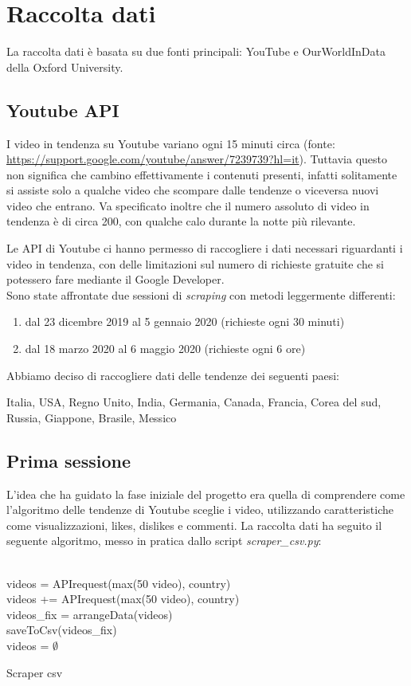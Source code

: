 \section*{Raccolta dati}
La raccolta dati è basata su due fonti principali: YouTube e OurWorldInData della Oxford University.

\subsection*{Youtube API}
I video in tendenza su Youtube variano ogni 15 minuti circa (fonte: \url{https://support.google.com/youtube/answer/7239739?hl=it}). Tuttavia questo non significa che cambino effettivamente i contenuti presenti, infatti solitamente si assiste solo a qualche video che scompare dalle tendenze o viceversa nuovi video che entrano. Va specificato inoltre che il numero assoluto di video in tendenza è di circa 200, con qualche calo durante la notte più rilevante.

Le API di Youtube ci hanno permesso di raccogliere i dati necessari riguardanti i video in tendenza, con delle limitazioni sul numero di richieste gratuite che si potessero fare mediante il Google Developer.
\\
Sono state affrontate due sessioni di \textit{scraping} con metodi leggermente differenti:
\begin{enumerate}
	\item dal 23 dicembre 2019 al 5 gennaio 2020 (richieste ogni 30 minuti)
	\item dal 18 marzo 2020 al 6 maggio 2020 (richieste ogni 6 ore)
\end{enumerate}
Abbiamo deciso di raccogliere dati delle tendenze dei seguenti paesi:

Italia, USA, Regno Unito, India, Germania, Canada, Francia, Corea del sud, Russia, Giappone, Brasile, Messico\\

\subsection*{Prima sessione}
L'idea che ha guidato la fase iniziale del progetto era quella di comprendere come l'algoritmo delle tendenze di Youtube sceglie i video, utilizzando caratteristiche come visualizzazioni, likes, dislikes e commenti. La raccolta dati ha seguito il seguente algoritmo, messo in pratica dallo script \textit{scraper\_csv.py}:\\
\\
\begin{algorithm}[H]
	\nl {} {
	\nl {}
	{
		\nl videos = APIrequest(max(50 video), country)\\
		\nl {}
		{
			\nl videos += APIrequest(max(50 video), country) \\
		}
		\nl videos\_fix = arrangeData(videos)\\ 
		\nl saveToCsv(videos\_fix) \\
		\nl videos = $\emptyset$
	}
	}
	\caption{Scraper csv}
\end{algorithm}

